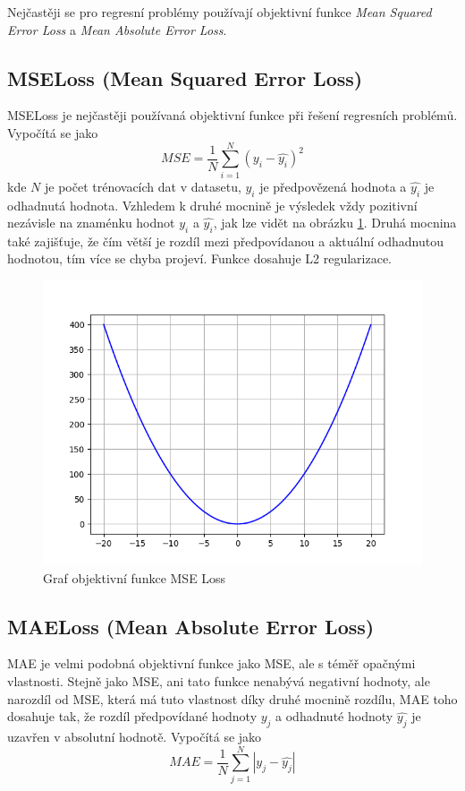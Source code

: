 Nejčastěji se pro regresní problémy používají objektivní funkce \textit{Mean Squared Error Loss} a \textit{Mean Absolute Error Loss}.


\subsection*{MSELoss (Mean Squared Error Loss)}
MSELoss je nejčastěji používaná objektivní funkce při řešení regresních problémů. Vypočítá se jako
\begin{equation}
  MSE = \frac{1}{N}\sum_{i=1}^N(y_i - \hat{y_i})^2
\end{equation}
kde $N$ je počet trénovacích dat v datasetu, $y_i$ je předpovězená hodnota a $\hat{y_i}$ je odhadnutá hodnota. Vzhledem k druhé mocnině je výsledek vždy pozitivní nezávisle na znaménku hodnot $y_i$ a $\hat{y_i}$, jak lze vidět na obrázku \ref{fig:mseloss}. Druhá mocnina také zajišťuje, že čím větší je rozdíl mezi předpovídanou a aktuální odhadnutou hodnotou, tím více se chyba projeví. Funkce dosahuje L2 regularizace.

\begin{figure}[H]
    \centering
    \includegraphics[scale=0.4]{obrazky-figures/mseloss.png}
    \caption{\label{fig:mseloss}Graf objektivní funkce MSE Loss}
\end{figure}


\subsection*{MAELoss (Mean Absolute Error Loss)}
MAE je velmi podobná objektivní funkce jako MSE, ale s téměř opačnými vlastnosti. Stejně jako MSE, ani tato funkce nenabývá negativní hodnoty, ale narozdíl od MSE, která má tuto vlastnost díky druhé mocnině rozdílu, MAE toho dosahuje tak, že rozdíl předpovídané hodnoty $y_j$ a odhadnuté hodnoty $\hat{y_j}$ je uzavřen v absolutní hodnotě. Vypočítá se jako
\begin{equation}
  MAE = \frac{1}{N}\sum_{j=1}^N|y_j - \hat{y_j}|
\end{equation}

